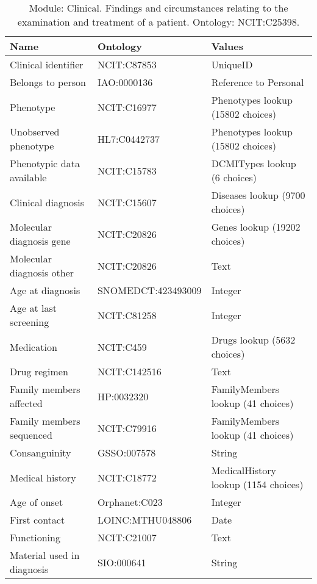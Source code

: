 \documentclass{article}
\begin{document}
\begin{table}[htb]
\begin{tabular}{lll}
Name & Ontology & Values \\
\hline
Clinical identifier & NCIT:C87853 & UniqueID \\
Belongs to person & IAO:0000136 & Reference to Personal \\
Phenotype & NCIT:C16977 & Phenotypes lookup (15802 choices) \\
Unobserved phenotype & HL7:C0442737 & Phenotypes lookup (15802 choices) \\
Phenotypic data available & NCIT:C15783 & DCMITypes lookup (6 choices) \\
Clinical diagnosis & NCIT:C15607 & Diseases lookup (9700 choices) \\
Molecular diagnosis gene & NCIT:C20826 & Genes lookup (19202 choices) \\
Molecular diagnosis other & NCIT:C20826 & Text \\
Age at diagnosis & SNOMEDCT:423493009 & Integer \\
Age at last screening & NCIT:C81258 & Integer \\
Medication & NCIT:C459 & Drugs lookup (5632 choices) \\
Drug regimen & NCIT:C142516 & Text \\
Family members affected & HP:0032320 & FamilyMembers lookup (41 choices) \\
Family members sequenced & NCIT:C79916 & FamilyMembers lookup (41 choices) \\
Consanguinity & GSSO:007578 & String \\
Medical history & NCIT:C18772 & MedicalHistory lookup (1154 choices) \\
Age of onset & Orphanet:C023 & Integer \\
First contact & LOINC:MTHU048806 & Date \\
Functioning & NCIT:C21007 & Text \\
Material used in diagnosis & SIO:000641 & String \\
\hline
\end{tabular}
\caption[Module: Clinical]{\label{table:table6} Module: Clinical. Findings and circumstances relating to the examination and treatment of a patient. Ontology: NCIT:C25398. }
\end{table}
\end{document}
